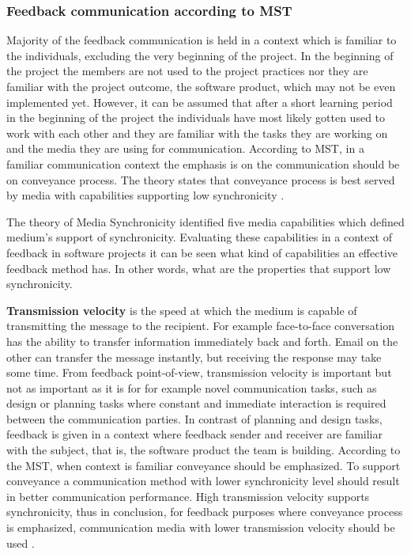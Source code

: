 \documentclass[english,12pt,a4paper,pdftex]{article}
\begin{document}
\subsubsection{Feedback communication according to MST}

Majority of the feedback communication is held in a context which is familiar to the individuals, excluding the very beginning of the project. In the beginning of the project the members are not used to the project practices nor they are familiar with the project outcome, the software product, which may not be even implemented yet. However, it can be assumed that after a short learning period in the beginning of the project the individuals have most likely gotten used to work with each other and they are familiar with the tasks they are working on and the media they are using for communication. According to \ac{MST}, in a familiar communication context the emphasis is on the communication should be on conveyance process. The theory states that conveyance process is best served by media with capabilities supporting low synchronicity \citep{dennis1999} \citep{dennis2008}.

The theory of Media Synchronicity identified five media capabilities which defined medium's support of synchronicity. Evaluating these capabilities in a context of feedback in software projects it can be seen what kind of capabilities an effective feedback method has. In other words, what are the properties that support low synchronicity.

\textbf{Transmission velocity} is the speed at which the medium is capable of transmitting the message to the recipient. For example face-to-face conversation has the ability to transfer information immediately back and forth. Email on the other can transfer the message instantly, but receiving the response may take some time. From feedback point-of-view, transmission velocity is important but not as important as it is for for example novel communication tasks, such as design or planning tasks where constant and immediate interaction is required between the communication parties. In contrast of planning and design tasks, feedback is given in a context where feedback sender and receiver are familiar with the subject, that is, the software product the team is building. According to the \ac{MST}, when context is familiar conveyance should be emphasized. To support conveyance a communication method with lower synchronicity level should result in better communication performance. High transmission velocity supports synchronicity, thus in conclusion, for feedback purposes where conveyance process is emphasized, communication media with lower transmission velocity should be used \citep{dennis1999}.
\end{document}
